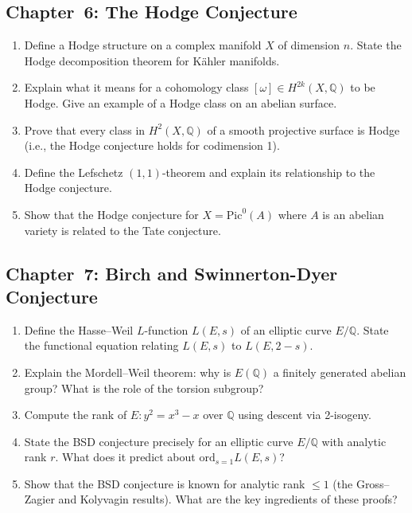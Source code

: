\subsection{Chapter~6: The Hodge Conjecture}

\begin{enumerate}[label=\textbf{6.\arabic*.},leftmargin=2.5em]
\item Define a Hodge structure on a complex manifold $X$ of dimension $n$. State the Hodge decomposition theorem for K\"{a}hler manifolds.

\item Explain what it means for a cohomology class $[\omega] \in H^{2k}(X, \mathbb{Q})$ to be Hodge. Give an example of a Hodge class on an abelian surface.

\item Prove that every class in $H^{2}(X, \mathbb{Q})$ of a smooth projective surface is Hodge (i.e., the Hodge conjecture holds for codimension 1).

\item Define the Lefschetz $(1,1)$-theorem and explain its relationship to the Hodge conjecture.

\item Show that the Hodge conjecture for $X = \text{Pic}^0(A)$ where $A$ is an abelian variety is related to the Tate conjecture.
\end{enumerate}

\subsection{Chapter~7: Birch and Swinnerton-Dyer Conjecture}

\begin{enumerate}[label=\textbf{7.\arabic*.},leftmargin=2.5em]
\item Define the Hasse--Weil $L$-function $L(E, s)$ of an elliptic curve $E/\mathbb{Q}$. State the functional equation relating $L(E, s)$ to $L(E, 2-s)$.

\item Explain the Mordell--Weil theorem: why is $E(\mathbb{Q})$ a finitely generated abelian group? What is the role of the torsion subgroup?

\item Compute the rank of $E: y^2 = x^3 - x$ over $\mathbb{Q}$ using descent via 2-isogeny.

\item State the BSD conjecture precisely for an elliptic curve $E/\mathbb{Q}$ with analytic rank $r$. What does it predict about $\text{ord}_{s=1} L(E, s)$?

\item Show that the BSD conjecture is known for analytic rank $\leq 1$ (the Gross--Zagier and Kolyvagin results). What are the key ingredients of these proofs?
\end{enumerate}

